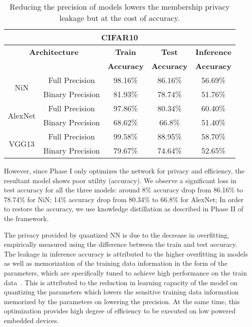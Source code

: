 \begin{table}[!htb]
\begin{center}
\renewcommand\arraystretch{1.5}
\fontsize{6.7pt}{6.7pt}\selectfont
\begin{tabular}{|c|c|c|c|c|}
\hline
\multicolumn{5}{|c|}{\textbf{CIFAR10}} \\
\hline
\multicolumn{2}{|c|}{\textbf{Architecture}} & \textbf{Train}  & \textbf{Test}  & \textbf{Inference}  \\
 \multicolumn{2}{|c|}{} & \textbf{Accuracy} & \textbf{Accuracy} & \textbf{Accuracy}  \\
\hline
\multirow{2}{*}{NiN} & Full Precision & 98.16\% & 86.16\% & \cellcolor{red!25}56.69\% \\
& Binary Precision & 81.93\% & 78.74\% & \cellcolor{green!25}51.76\% \\
\hline
\multirow{2}{*}{AlexNet} & Full Precision & 97.86\% & 80.34\% & \cellcolor{red!25}60.40\% \\
& Binary Precision & 68.62\% & 66.8\% & \cellcolor{green!25}51.40\% \\
\hline
\multirow{2}{*}{VGG13} & Full Precision & 99.58\% & 88.95\% & \cellcolor{red!25}58.70\%\\
& Binary Precision & 79.67\% & 74.64\% & \cellcolor{green!25}52.65\%\\
\hline
\end{tabular}
\end{center}
\caption{Reducing the precision of models lowers the membership privacy leakage but at the cost of accuracy.}
\label{cifar10quant}
\end{table}


However, since Phase I only optimizes the network for privacy and efficiency, the resultant model shows poor utility (accuracy).
We observe a significant loss in test accuracy for all the three models: around 8\% accuracy drop from 86.16\% to 78.74\% for NiN; 14\% accuracy drop from 80.34\% to 66.8\% for AlexNet;
In order to restore the accuracy, we use knowledge distillation as described in Phase II of the \method\hspace{0.02in} framework.

The privacy provided by quantized NN is due to the decrease in overfitting, empirically measured using the difference between the train and test accuracy.
The leakage in inference accuracy is attributed to the higher overfitting in models as well as memorization of the training data information in the form of the parameters, which are specifically tuned to achieve high performance on the train data~\cite{10.1145/3133956.3134077,236216,DBLP:journals/corr/abs-1812-00910}.
This is attributed to the reduction in learning capacity of the model on quantizing the parameters which lowers the sensitive training data information memorized by the parameters on lowering the precision.
At the same time, this optimization provides high degree of efficiency to be executed on low powered embedded devices.

